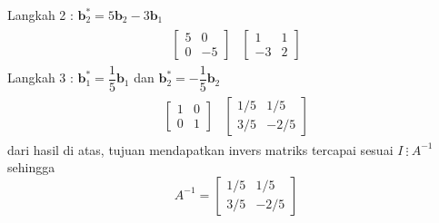 Langkah 2 : $\textbf{b}^*_2= 5\textbf{b}_2 - 3\textbf{b}_1$ \\
\begin{align*}
	\begin{array}{r|r} 
		\left[
		\begin{array}{rr} 
			5 & 0 \\
			0 & -5 
		\end{array} 
		\right]  &  \left[
		\begin{array}{rr} 
			1 & 1 \\
			-3 & 2 
		\end{array} 
		\right]
	\end{array}
\end{align*}
Langkah 3 : $\textbf{b}^*_1= \dfrac{1}{5}\textbf{b}_1 $ dan $\textbf{b}^*_2= -\dfrac{1}{5}\textbf{b}_2$ \\
\begin{align*}
	\begin{array}{r|r} 
		\left[
		\begin{array}{rr} 
			1 & 0 \\
			0 & 1 
		\end{array} 
		\right]  &  \left[
		\begin{array}{rr} 
			1/5 & 1/5 \\
			3/5 & -2/5 
		\end{array} 
		\right]
	\end{array}
\end{align*}
dari hasil di atas, tujuan mendapatkan invers matriks  tercapai sesuai $I ~\vdots~ A^{-1}$ sehingga $$A^{-1}=\left[
\begin{array}{rr} 
	1/5 & 1/5 \\
	3/5 & -2/5 
\end{array} 
\right]$$
